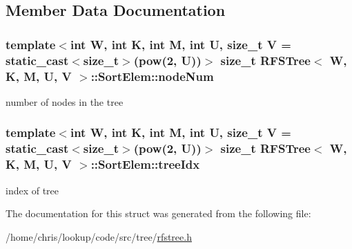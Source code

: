 \subsection{Member Data Documentation}
\hypertarget{structRFSTree_1_1SortElem_aae1299c3b2ef56d4cbad434f9dc7300b}{
\subsubsection[{node\-Num}]{\setlength{\rightskip}{0pt plus 5cm}template$<$int W, int K, int M, int U, size\-\_\-t V = static\-\_\-cast$<$size\-\_\-t$>$(pow(2, U))$>$ size\-\_\-t {\bf R\-F\-S\-Tree}$<$ {\bf W}, K, M, U, V $>$\-::Sort\-Elem\-::node\-Num}}\label{structRFSTree_1_1SortElem_aae1299c3b2ef56d4cbad434f9dc7300b}


number of nodes in the tree 

\hypertarget{structRFSTree_1_1SortElem_ae8f9ed84510428c9d9f9904a1764b05f}{
\subsubsection[{tree\-Idx}]{\setlength{\rightskip}{0pt plus 5cm}template$<$int W, int K, int M, int U, size\-\_\-t V = static\-\_\-cast$<$size\-\_\-t$>$(pow(2, U))$>$ size\-\_\-t {\bf R\-F\-S\-Tree}$<$ {\bf W}, K, M, U, V $>$\-::Sort\-Elem\-::tree\-Idx}}\label{structRFSTree_1_1SortElem_ae8f9ed84510428c9d9f9904a1764b05f}


index of tree 



The documentation for this struct was generated from the following file\-:\begin{DoxyCompactItemize}
\item 
/home/chris/lookup/code/src/tree/\hyperlink{rfstree_8h}{rfstree.\-h}\end{DoxyCompactItemize}
